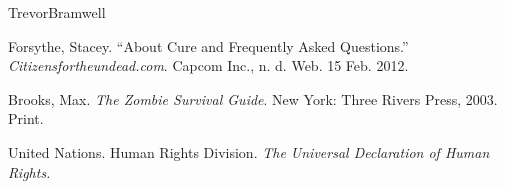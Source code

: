 \documentclass[12pt,letterpaper]{article}
\begin{document}
\begin{mla}{Trevor}{Bramwell}
\begin{workscited}
\bibent
Forsythe, Stacey. ``About Cure and Frequently Asked Questions.'' \emph{Citizensfortheundead.com}. Capcom Inc., n. d. Web. 15 Feb. 2012.

\bibent
Brooks, Max. \emph{The Zombie Survival Guide}. New York: Three Rivers Press,
2003. Print.

\bibent
United Nations. Human Rights Division. \emph{The Universal Declaration of Human Rights.} 
\end{workscited}
\end{mla}
\end{document}
